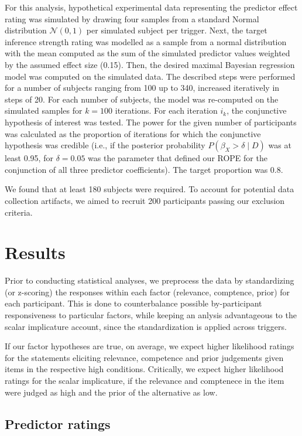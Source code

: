 \documentclass{sp}
\begin{document}
For this analysis, hypothetical experimental data representing the predictor effect rating was simulated by drawing four samples from a standard Normal distribution $\mathcal{N}(0,1)$ per simulated subject per trigger. Next, the target inference strength rating was modelled as a sample from a normal distribution with the mean computed as the sum of the simulated predictor values weighted by the assumed effect size (0.15). Then, the desired maximal Bayesian regression model was computed on the simulated data. The described steps were performed for a number of subjects ranging from 100 up to 340, increased iteratively in steps of 20. For each number of subjects, the model was re-computed on the simulated samples for $k=100$ iterations. For each iteration $i_k$, the conjunctive hypothesis of interest was tested. 
The power for the given number of participants was calculated as the proportion of iterations for which the conjunctive hypothesis was credible (i.e., if the posterior probability $P(\beta_X > \delta \mid D)$ was at least 0.95, for $\delta = 0.05$ was the parameter that defined our ROPE for the conjunction of all three predictor coefficients). The target proportion was 0.8.

We found that at least 180 subjects were required. To account for potential data collection artifacts, we aimed to recruit 200 participants passing our exclusion criteria.

\section{Results}
Prior to conducting statistical analyses, we preprocess the data by standardizing (or z-scoring) the responses within each factor (relevance, comptence, prior) for each participant. This is done to counterbalance possible by-participant responsiveness to particular factors, while keeping an anlysis advantageous to the scalar implicature account, since the standardization is applied across triggers. 

If our factor hypotheses are true, on average, we expect higher likelihood ratings for the statements eliciting relevance, competence and prior judgements given items in the respective high conditions. Critically, we expect higher likelihood ratings for the scalar implicature, if the relevance and comptenece in the item were judged as high and the prior of the alternative as low.

\subsection{Predictor ratings}
\end{document}
